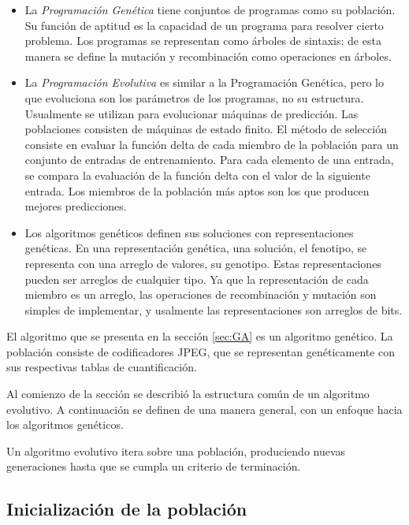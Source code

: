 \begin{itemize}
   \item La \emph{Programación Genética} \cite{GenProg} tiene conjuntos de
      programas como su población. Su función de aptitud es la capacidad de un
      programa para resolver cierto problema. Los programas se representan como
      árboles de sintaxis; de esta manera se define la mutación y recombinación como
      operaciones en árboles.
   \item La \emph{Programación Evolutiva} es similar a la Programación Genética,
      pero lo que evoluciona son los parámetros de los programas, no su
      estructura. Usualmente se utilizan para evolucionar máquinas de
      predicción. Las poblaciones consisten de máquinas de estado finito. El
      método de selección consiste en evaluar la función delta de cada miembro
      de la población para un conjunto de entradas de entrenamiento. Para cada
      elemento de una entrada, se compara la evaluación de la función delta con
      el valor de la siguiente entrada. Los miembros de la población más aptos son
      los que producen mejores predicciones.
   \item Los algoritmos genéticos definen sus soluciones con representaciones
      genéticas. En una representación genética, una solución, el fenotipo, se
      representa con una arreglo de valores, su genotipo.  Estas
      representaciones pueden ser arreglos de cualquier tipo. Ya que la
      representación de cada miembro es un arreglo, las operaciones de
      recombinación y mutación son simples de implementar, y usalmente las
      representaciones son arreglos de bits.
\end{itemize}

El algoritmo que se presenta en la sección \ref{sec:GA} es un algoritmo
genético. La población consiste de codificadores JPEG, que se representan
genéticamente con sus respectivas tablas de cuantificación.

Al comienzo de la sección se describió la estructura común de un algoritmo
evolutivo. A continuación se definen de una manera general, con un enfoque hacia
los algoritmos genéticos.

Un algoritmo evolutivo itera sobre una población, produciendo nuevas
generaciones hasta que se cumpla un criterio de terminación.

\subsection { Inicialización de la población }

